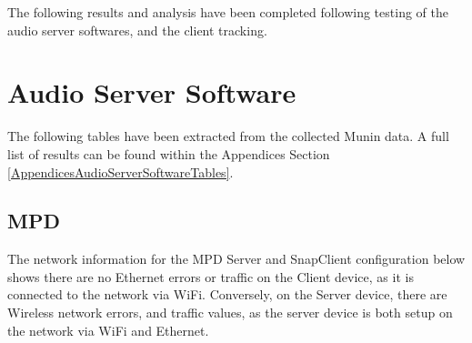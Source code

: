 \documentclass[11pt,a4paper]{scrreprt}
\begin{document}
The following results and analysis have been completed following testing
of the audio server softwares, and the client tracking.

\section{\texorpdfstring{Audio Server Software
\label{AudioServerSoftwareResults}}{Audio Server Software }}\label{audio-server-software}

The following tables have been extracted from the collected Munin data.
A full list of results can be found within the Appendices Section
\ref{AppendicesAudioServerSoftwareTables}.

\subsection{MPD}\label{mpd-1}

The network information for the MPD Server and SnapClient configuration
below shows there are no Ethernet errors or traffic on the Client
device, as it is connected to the network via WiFi. Conversely, on the
Server device, there are Wireless network errors, and traffic values, as
the server device is both setup on the network via WiFi and Ethernet.
\end{document}

